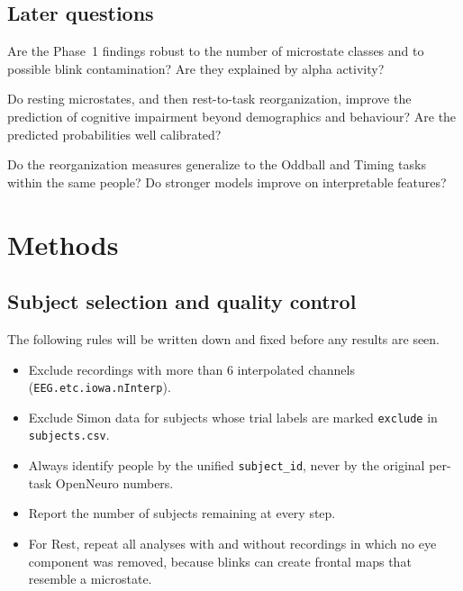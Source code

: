 \documentclass[11pt,a4paper]{article}
\begin{document}
\subsection*{Later questions}

\begin{description}[leftmargin=1.2em, style=nextline]
  \item[RQ4 --- Robustness (Phase 2).] Are the Phase~1 findings robust to the number of microstate classes and to possible blink contamination? Are they explained by alpha activity?
  \item[RQ5 --- Added value (Phase 3).] Do resting microstates, and then rest-to-task reorganization, improve the prediction of cognitive impairment beyond demographics and behaviour? Are the predicted probabilities well calibrated?
  \item[RQ6 --- Generalization (Phase 4).] Do the reorganization measures generalize to the Oddball and Timing tasks within the same people? Do stronger models improve on interpretable features?
\end{description}

\section{Methods}

\subsection{Subject selection and quality control}

The following rules will be written down and fixed before any results are seen.

\begin{itemize}
  \item Exclude recordings with more than 6 interpolated channels (\texttt{EEG.etc.iowa.nInterp}).
  \item Exclude Simon data for subjects whose trial labels are marked \texttt{exclude} in \texttt{subjects.csv}.
  \item Always identify people by the unified \texttt{subject\_id}, never by the original per-task OpenNeuro numbers.
  \item Report the number of subjects remaining at every step.
  \item For Rest, repeat all analyses with and without recordings in which no eye component was removed, because blinks can create frontal maps that resemble a microstate.
\end{itemize}
\end{document}
